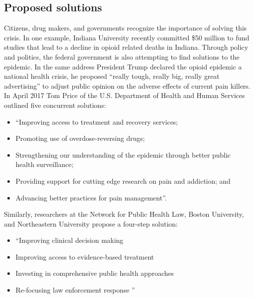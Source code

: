 \documentclass[sigconf]{acmart}
\begin{document}
\subsection{Proposed solutions}
Citizens, drug makers, and governments recognize the importance of solving this crisis. In one example, Indiana University recently committed \$50 million to fund studies that lead to a decline in opioid related deaths in Indiana. Through policy and politics, the federal government is also attempting to find solutions to the epidemic. In the same address President Trump declared the opioid epidemic a national health crisis, he proposed “really tough, really big, really great advertising” to adjust public opinion on the adverse effects of current pain killers\cite{opsis6}. In April 2017 Tom Price of the U.S. Department of Health and Human Services outlined five concurrent solutions:
\begin{itemize}
\item ``Improving access to treatment and recovery services;
\item Promoting use of overdose-reversing drugs;
\item Strengthening our understanding of the epidemic through better public health surveillance;
\item Providing support for cutting edge research on pain and addiction; and
\item Advancing better practices for pain management''\cite{opsis7}.
\end{itemize} 

Similarly, researchers at the Network for Public Health Law, Boston University, and Northeastern University propose a four-step solution:
\begin{itemize}
\item ``Improving clinical decision making
\item Improving access to evidence-based treatment
\item Investing in comprehensive public health approaches
\item Re-focusing law enforcement response ''\cite{Davis01}
\end{itemize}
\end{document}
